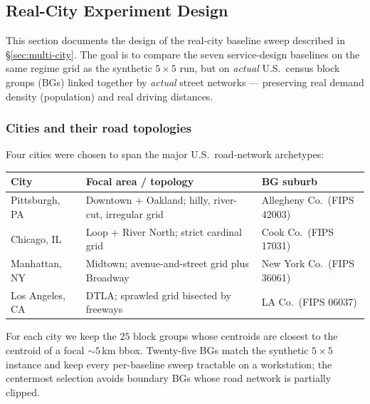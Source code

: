 %

\subsection{Real-City Experiment Design}\label{sec:real-city-design}

This section documents the design of the real-city baseline sweep
described in \S\ref{sec:multi-city}. The goal is to compare the seven
service-design baselines on the same regime grid as the synthetic
$5\times5$ run, but on \emph{actual} U.S.\ census block groups (BGs)
linked together by \emph{actual} street networks --- preserving
real demand density (population) and real driving distances.

\subsubsection{Cities and their road topologies}

Four cities were chosen to span the major U.S.\ road-network archetypes:

\begin{center}
\small
\begin{tabular}{lll}
\toprule
City & Focal area / topology & BG suburb \\
\midrule
Pittsburgh, PA & Downtown + Oakland; hilly, river-cut, irregular grid &
   Allegheny Co.\ (FIPS 42003) \\
Chicago, IL    & Loop + River North; strict cardinal grid &
   Cook Co.\ (FIPS 17031) \\
Manhattan, NY  & Midtown; avenue-and-street grid plus Broadway &
   New York Co.\ (FIPS 36061) \\
Los Angeles, CA & DTLA; sprawled grid bisected by freeways &
   LA Co.\ (FIPS 06037) \\
\bottomrule
\end{tabular}
\end{center}

For each city we keep the $25$ block groups whose centroids are
closest to the centroid of a focal $\sim 5\,$km bbox. Twenty-five BGs
match the synthetic $5\times5$ instance and keep every per-baseline
sweep tractable on a workstation; the centermost selection avoids
boundary BGs whose road network is partially clipped.

